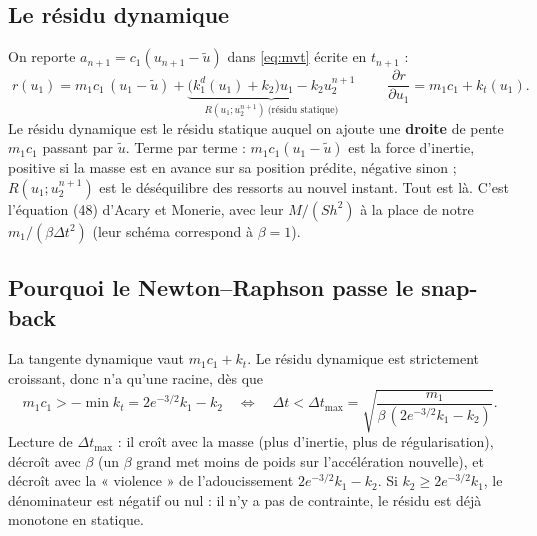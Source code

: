 \documentclass[11pt,a4paper]{article}
\newcommand{\kd}{k_1^{d}}
\begin{document}
\subsection{Le résidu dynamique}
On reporte $a_{n+1} = c_1(u_{n+1}-\tilde u)$ dans \eqref{eq:mvt} écrite en $t_{n+1}$ :
\begin{equation}
  \boxed{\;r(u_1) = m_1c_1\,(u_1-\tilde u) + \underbrace{\bigl(\kd(u_1)+k_2\bigr)u_1 - k_2u_2^{n+1}}_{R(u_1;u_2^{n+1})\ \text{(résidu statique)}}\;}
  \qquad
  \frac{\partial r}{\partial u_1} = m_1c_1 + k_t(u_1).
  \label{eq:rdyn}
\end{equation}
Le résidu dynamique est le résidu statique auquel on ajoute une \textbf{droite} de pente $m_1c_1$
passant par $\tilde u$. Terme par terme : $m_1c_1(u_1-\tilde u)$ est la force d'inertie, positive
si la masse est en avance sur sa position prédite, négative sinon ; $R(u_1;u_2^{n+1})$ est le
déséquilibre des ressorts au nouvel instant. Tout est là. C'est l'équation (48) d'Acary et
Monerie, avec leur $M/(Sh^2)$ à la place de notre $m_1/(\beta\Delta t^2)$ (leur schéma correspond
à $\beta = 1$).

\subsection{Pourquoi le Newton--Raphson passe le snap-back}
La tangente dynamique vaut $m_1c_1 + k_t$. Le résidu dynamique est strictement croissant, donc
n'a qu'une racine, dès que
\begin{equation}
  m_1c_1 > -\min k_t = 2e^{-3/2}k_1 - k_2
  \quad\Longleftrightarrow\quad
  \Delta t < \Delta t_{\max} = \sqrt{\frac{m_1}{\beta\,(2e^{-3/2}k_1-k_2)}} .
  \label{eq:dtmax}
\end{equation}
Lecture de $\Delta t_{\max}$ : il croît avec la masse (plus d'inertie, plus de régularisation),
décroît avec $\beta$ (un $\beta$ grand met moins de poids sur l'accélération nouvelle), et
décroît avec la « violence » de l'adoucissement $2e^{-3/2}k_1 - k_2$. Si $k_2 \ge 2e^{-3/2}k_1$,
le dénominateur est négatif ou nul : il n'y a pas de contrainte, le résidu est déjà monotone en
statique.
\end{document}
